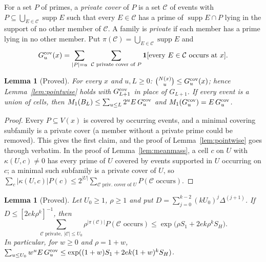 \documentclass[11pt,reqno]{amsart}
\newtheorem{lemma}[theorem]{Lemma}
\theoremstyle{definition}
\newcommand{\supp}{\operatorname{supp}}
\begin{document}
For a set $P$ of primes, a \emph{private cover} of $P$ is a set $\mathcal C$ of
events with $P\subseteq\bigcup_{E\in\mathcal C}\supp E$ such that every
$E\in\mathcal C$ has a prime of $\supp E\cap P$ lying in the support of no other
member of $\mathcal C$.  A family is \emph{private} if each member has a prime
lying in no other member.  Put $\pi(\mathcal C)=\bigcup_{E\in\mathcal C}\supp E$ and
\[
 G^{\rm cov}_u(x)=\sum_{|P|=u}\ \sum_{\mathcal C\text{ private cover of }P}\mathbf 1[\text{every }E\in\mathcal C\text{ occurs at }x].
\]

\begin{lemma}[Proved]\label{lem:cov}
For every $x$ and $u,L\ge0$: $\binom{N(x)}u\le G^{\rm cov}_u(x)$; hence
Lemma~\ref{lem:pointwise} holds with $G^{\rm cov}_{L+1}$ in place of $G_{L+1}$.
If every event is a union of cells, then
$M_1(B_L)\le\sum_{u\le L}2^uE\,G^{\rm cov}_u$ and $M_1(G^{\rm cov}_u)=E\,G^{\rm cov}_u$.
\end{lemma}

\begin{proof}
Every $P\subseteq V(x)$ is covered by occurring events, and a minimal covering
subfamily is a private cover (a member without a private prime could be
removed).  This gives the first claim, and the proof of
Lemma~\ref{lem:pointwise} goes through verbatim.  In the proof of
Lemma~\ref{lem:meanmass}, a cell $c$ on $U$ with $\kappa(U,c)\ne0$ has every
prime of $U$ covered by events supported in $U$ occurring on $c$; a minimal
such subfamily is a private cover of $U$, so
$\sum_c|\kappa(U,c)|P(c)\le2^{|U|}\sum_{\mathcal C\text{ priv.\ cover of }U}P(\mathcal C\text{ occurs})$.
\end{proof}

\begin{lemma}[Proved]\label{lem:hypmom}
Let $U_0\ge1$, $\rho\ge1$ and put
$D=\sum_{j=0}^{k-2}(kU_0)^j\Delta^{(j+1)}$.  If $D\le[2ek\rho^k]^{-1}$, then
\[
 \sum_{\mathcal C\text{ private},\ |\mathcal C|\le U_0}\rho^{|\pi(\mathcal C)|}P(\mathcal C\text{ occurs})
 \le\exp\big(\rho S_1+2ek\rho^kS_H\big).
\]
In particular, for $w\ge0$ and $\rho=1+w$,
$\sum_{u\le U_0}w^uE\,G^{\rm cov}_u\le\exp((1+w)S_1+2ek(1+w)^kS_H)$.
\end{lemma}
\end{document}
